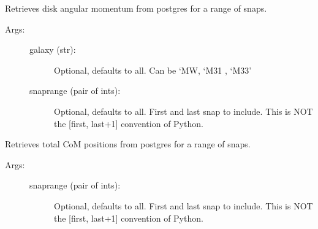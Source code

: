 \documentclass[letterpaper,10pt,english]{sphinxmanual}
\begin{document}
\begin{fulllineitems}

\begin{fulllineitems}
\label{\detokenize{timecourse:galaxy.timecourse.TimeCourse.read_angmom_db}}
Retrieves disk angular momentum from postgres for a range of snaps.
\begin{description}
\item[{Args:}] \leavevmode\begin{description}
\item[{galaxy (str):}] \leavevmode
Optional, defaults to all. Can be ‘MW, ‘M31 , ‘M33’

\item[{snaprange (pair of ints):}] \leavevmode
Optional, defaults to all. First and last snap to include.
This is NOT the {[}first, last+1{]} convention of Python.

\end{description}

\end{description}

\end{fulllineitems}


\begin{fulllineitems}
\label{\detokenize{timecourse:galaxy.timecourse.TimeCourse.read_total_com_db}}
Retrieves total CoM positions from postgres for a range of snaps.
\begin{description}
\item[{Args:}] \leavevmode\begin{description}
\item[{snaprange (pair of ints):}] \leavevmode
Optional, defaults to all. First and last snap to include.
This is NOT the {[}first, last+1{]} convention of Python.

\end{description}

\end{description}

\end{fulllineitems}


\end{fulllineitems}
\end{document}
